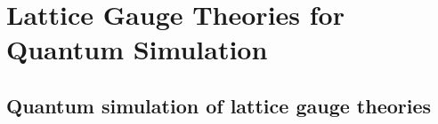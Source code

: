 \chapter{Lattice Gauge Theories for Quantum Simulation}
\label{chap:lattice_gauge_theories_for_quantum_simulation}




\section{Quantum simulation of lattice gauge theories}
\label{sec:quantum_simulation_of_lattice_gauge_theories}


